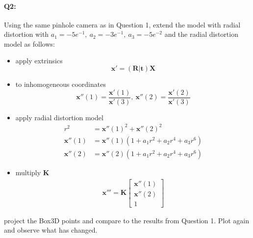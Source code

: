 \documentclass[a4paper]{article}
\begin{document}
\paragraph{Q2:}
Using the same pinhole camera as in Question 1, extend the model with radial distortion with $a_1 = -5e^{-1},\ a_2 = -3e^{-1},\ a_3 = -5e^{-2}$ and the radial distortion model as follows:
\begin{itemize}
\item apply extrinsics $$ \mathbf{x}' = \left(\mathbf{R} | \mathbf{t}\right) \mathbf{X} $$
\item to inhomogeneous coordinates
$$
\mathbf{x}''(1)=\frac{\mathbf{x}'(1)}{\mathbf{x}'(3)},\ \mathbf{x}''(2)=\frac{\mathbf{x}'(2)}{\mathbf{x}'(3)}
$$
\item apply radial distortion model
\begin{align*}
r^2 &= \mathbf{x}''(1)^2+\mathbf{x}''(2)^2 \\
\mathbf{x}''(1) &= \mathbf{x}''(1)(1+a_1r^2+a_2r^4+a_3r^6) \\
\mathbf{x}''(2) &= \mathbf{x}''(2)(1+a_1r^2+a_2r^4+a_3r^6)
\end{align*}
\item multiply $\mathbf{K}$
\begin{align*}
\mathbf{x}''' = \mathbf{K}\left[
\begin{matrix}
\mathbf{x}''(1) \\ \mathbf{x}''(2) \\ 1
\end{matrix}
\right]
\end{align*}

\end{itemize}
project the Box3D points and compare to the results from Question 1. Plot again and observe what has changed.
\end{document}
